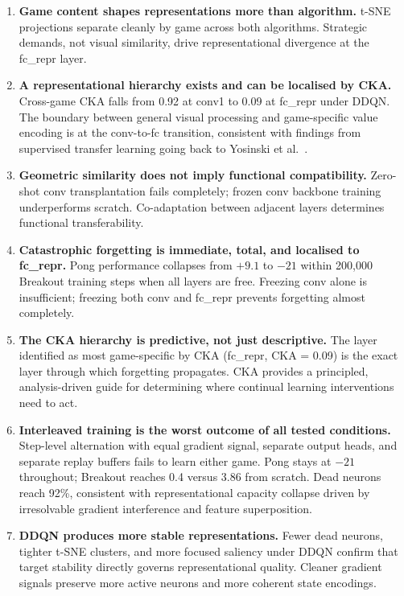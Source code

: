 \documentclass[a4paper]{article}
\begin{document}
\begin{enumerate}
    \item \textbf{Game content shapes representations more than algorithm.} t-SNE projections
    separate cleanly by game across both algorithms. Strategic demands, not visual similarity,
    drive representational divergence at the fc\_repr layer.

    \item \textbf{A representational hierarchy exists and can be localised by CKA.}
    Cross-game CKA falls from 0.92 at conv1 to 0.09 at fc\_repr under DDQN. The boundary
    between general visual processing and game-specific value encoding is at the conv-to-fc
    transition, consistent with findings from supervised transfer learning going back to
    Yosinski et al.\ \cite{yosinski2014transferable}.

    \item \textbf{Geometric similarity does not imply functional compatibility.} Zero-shot
    conv transplantation fails completely; frozen conv backbone training underperforms scratch.
    Co-adaptation between adjacent layers determines functional transferability.

    \item \textbf{Catastrophic forgetting is immediate, total, and localised to fc\_repr.}
    Pong performance collapses from $+9.1$ to $-21$ within 200,000 Breakout training steps
    when all layers are free. Freezing conv alone is insufficient; freezing both conv and
    fc\_repr prevents forgetting almost completely.

    \item \textbf{The CKA hierarchy is predictive, not just descriptive.} The layer
    identified as most game-specific by CKA (fc\_repr, CKA = 0.09) is the exact layer
    through which forgetting propagates. CKA provides a principled, analysis-driven guide
    for determining where continual learning interventions need to act.

    \item \textbf{Interleaved training is the worst outcome of all tested conditions.}
    Step-level alternation with equal gradient signal, separate output heads, and separate
    replay buffers fails to learn either game. Pong stays at $-21$ throughout; Breakout
    reaches 0.4 versus 3.86 from scratch. Dead neurons reach 92\%, consistent with
    representational capacity collapse driven by irresolvable gradient interference and
    feature superposition.

    \item \textbf{DDQN produces more stable representations.} Fewer dead neurons, tighter
    t-SNE clusters, and more focused saliency under DDQN confirm that target stability
    directly governs representational quality. Cleaner gradient signals preserve more active
    neurons and more coherent state encodings.


\end{enumerate}
\end{document}
